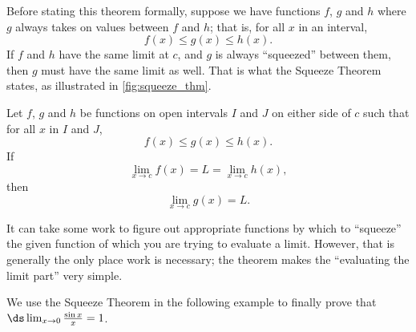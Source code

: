 Before stating this theorem formally, suppose we have functions $f$, $g$ and $h$ where $g$ always takes on values between $f$ and $h$; that is, for all $x$ in an interval, $$f(x) \leq g(x) \leq h(x).$$ If $f$ and $h$ have the same limit at $c$, and $g$  is always ``squeezed'' between them, then $g$ must have the same limit as well. That is what the Squeeze Theorem states, as illustrated in \autoref{fig:squeeze_thm}.


{Let $f$, $g$ and $h$ be functions on open intervals $I$ and $J$ on either side of $c$ such that for all $x$ in $I$ and $J$,
\[f(x)\leq g(x) \leq h(x).\]
If
\[\lim_{x\to c} f(x) = L = \lim_{x\to c} h(x),\]
then\[
\lim_{x\to c} g(x) = L.\]
}


It can take some work to figure out appropriate functions by which to ``squeeze'' the given function of which you are trying to evaluate a limit. However, that is generally the only place work is necessary; the theorem makes the ``evaluating the limit part'' very simple. 

We use the Squeeze Theorem in the following example to finally prove that $\ds \lim_{x\to 0} \frac{\sin x}{x} = 1$.

